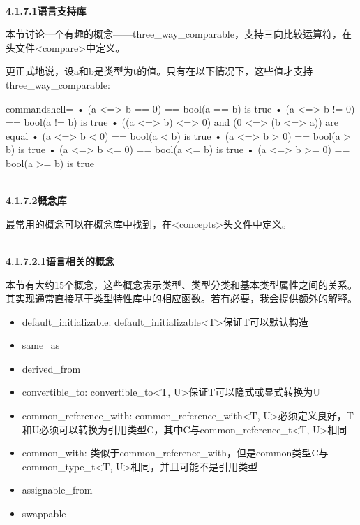 \hspace*{\fill} \\ %
\noindent
\textbf{4.1.7.1\hspace{0.2cm}语言支持库}

本节讨论一个有趣的概念——three\_way\_comparable，支持三向比较运算符，在头文件<compare>中定义。

更正式地说，设a和b是类型为t的值。只有在以下情况下，这些值才支持three\_way\_comparable:

\begin{tcblisting}{commandshell={}}
• (a <=> b == 0) == bool(a == b) is true
• (a <=> b != 0) == bool(a != b) is true
• ((a <=> b) <=> 0) and (0 <=> (b <=> a)) are equal
• (a <=> b < 0) == bool(a < b) is true
• (a <=> b > 0) == bool(a > b) is true
• (a <=> b <= 0) == bool(a <= b) is true
• (a <=> b >= 0) == bool(a >= b) is true
\end{tcblisting}

\hspace*{\fill} \\ %
\noindent
\textbf{4.1.7.2\hspace{0.2cm}概念库}

最常用的概念可以在概念库中找到，在<concepts>头文件中定义。

\hspace*{\fill} \\ %
\noindent
\textbf{4.1.7.2.1\hspace{0.2cm}语言相关的概念}

本节有大约15个概念，这些概念表示类型、类型分类和基本类型属性之间的关系。其实现通常直接基于\href{https://en.cppreference.com/w/cpp/header/type_traits}{类型特性库}中的相应函数。若有必要，我会提供额外的解释。

\begin{itemize}
\item
default\_initializable: default\_initializable<T>保证T可以默认构造

\item
same\_as

\item
derived\_from

\item
convertible\_to: convertible\_to<T, U>保证T可以隐式或显式转换为U

\item
common\_reference\_with: common\_reference\_with<T, U>必须定义良好，T和U必须可以转换为引用类型C，其中C与common\_reference\_t<T, U>相同

\item
common\_with: 类似于common\_reference\_with，但是common类型C与common\_type\_t<T, U>相同，并且可能不是引用类型

\item
assignable\_from

\item
swappable
\end{itemize}


